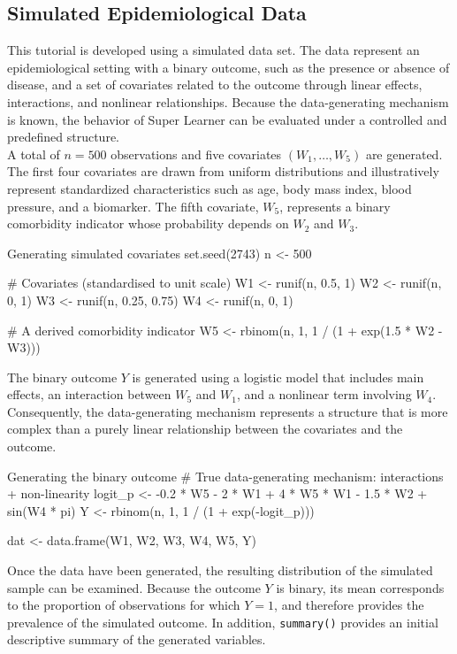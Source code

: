 \documentclass[12pt]{article}
\begin{document}
\subsection{Simulated Epidemiological Data}
This tutorial is developed using a simulated data set. The data represent an 
epidemiological setting with a binary outcome, such as the presence or absence 
of disease, and a set of covariates related to the outcome through linear effects, 
interactions, and nonlinear relationships. Because the data-generating mechanism 
is known, the behavior of Super Learner can be evaluated under a controlled and 
predefined structure. \\
A total of $n=500$ observations and five covariates $(W_1,\ldots,W_5)$ are 
generated. The first four covariates are drawn from uniform distributions and 
illustratively represent standardized characteristics such as age, body mass 
index, blood pressure, and a biomarker. The fifth covariate, $W_5$, represents a 
binary comorbidity indicator whose probability depends on $W_2$ and $W_3$.

\begin{rcode}[label={code:sim-covariates}]{Generating simulated covariates}
set.seed(2743)
n <- 500

# Covariates (standardised to unit scale)
W1 <- runif(n, 0.5, 1)
W2 <- runif(n, 0, 1)
W3 <- runif(n, 0.25, 0.75)
W4 <- runif(n, 0, 1)

# A derived comorbidity indicator
W5 <- rbinom(n, 1, 1 / (1 + exp(1.5 * W2 - W3)))
\end{rcode}

The binary outcome $Y$ is generated using a logistic model that includes main 
effects, an interaction between $W_5$ and $W_1$, and a nonlinear term involving 
$W_4$. Consequently, the data-generating mechanism represents a structure that 
is more complex than a purely linear relationship between the covariates and 
the outcome.

\begin{rcode}[label={code:sim-outcome}]{Generating the binary outcome}
# True data-generating mechanism: interactions + non-linearity
logit_p <- -0.2 * W5 - 2 * W1 + 4 * W5 * W1 - 1.5 * W2 + sin(W4 * pi)
Y <- rbinom(n, 1, 1 / (1 + exp(-logit_p)))

dat <- data.frame(W1, W2, W3, W4, W5, Y)
\end{rcode}

Once the data have been generated, the resulting distribution of the simulated 
sample can be examined. Because the outcome $Y$ is binary, its mean corresponds 
to the proportion of observations for which $Y=1$, and therefore provides the 
prevalence of the simulated outcome. In addition, \texttt{summary()} provides 
an initial descriptive summary of the generated variables.
\end{document}
